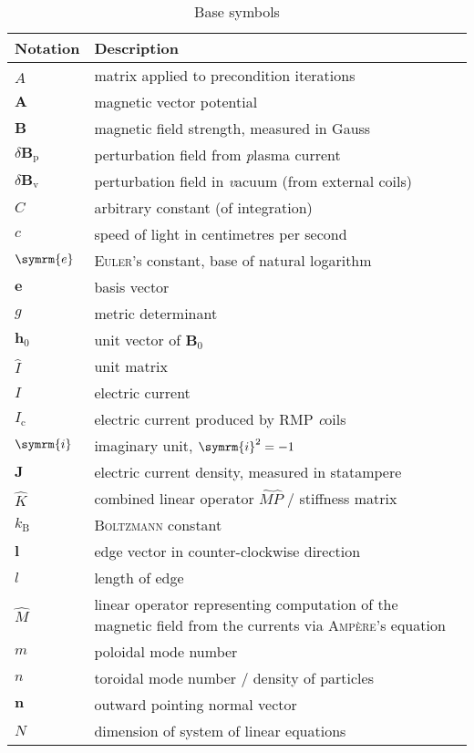 \documentclass[a4paper, twoside, 10pt, english]{article}
\numberwithin{equation}{section}
\let\vec\symbf
\newcommand*\e{\ensuremath{\symrm{e}}}  %
\newcommand*\im{\ensuremath{\symrm{i}}}  %
\newcommand*\Bvac{\ensuremath{\delta \vec{B}_{\text{v}}}}  %
\newcommand*\Bplas{\ensuremath{\delta \vec{B}_{\text{p}}}}  %
\begin{document}
\begin{longtable}{l >{\RaggedRight}p{}}
  \caption{Base symbols} \\
  \toprule
  \textbf{Notation} & \textbf{Description} \\
  \midrule
  \endhead
  \label{tab:symbols}%
  $\hat{A}$ & matrix applied to precondition iterations \\
  $\vec{A}$ & magnetic vector potential \\
  $\vec{B}$ & magnetic field strength, measured in Gauss \\
  $\Bplas$ & perturbation field from \emph{p}lasma current \\
  $\Bvac$ & perturbation field in \emph{v}acuum (from external coils) \\
  $C$ & arbitrary constant (of integration) \\
  $c$ & speed of light in centimetres per second \\
  $\e$ & \textsc{Euler}'s constant, base of natural logarithm \\
  $\vec{e}$ & basis vector \\
  $g$ & metric determinant \\
  $\vec{h}_{0}$ & unit vector of $\vec{B}_{0}$ \\
  $\hat{I}$ & unit matrix \\
  $I$ & electric current \\
  $I_{\text{c}}$ & electric current produced by RMP \emph{c}oils \\
  $\im$ & imaginary unit, $\im^{2} = -1$ \\
  $\vec{J}$ & electric current density, measured in statampere \\
  $\hat{K}$ & combined linear operator $\hat{M} \hat{P}$ / stiffness matrix \\
  $k_{\text{B}}$ & \textsc{Boltzmann} constant \\
  $\vec{l}$ & edge vector in counter-clockwise direction \\
  $l$ & length of edge \\
  $\hat{M}$ & linear operator representing computation of the magnetic field from the currents via \textsc{Ampère}'s equation \\
  $m$ & poloidal mode number \\
  $n$ & toroidal mode number / density of particles \\
  $\vec{n}$ & outward pointing normal vector \\
  $N$ & dimension of system of linear equations \\

\end{longtable}
\end{document}

